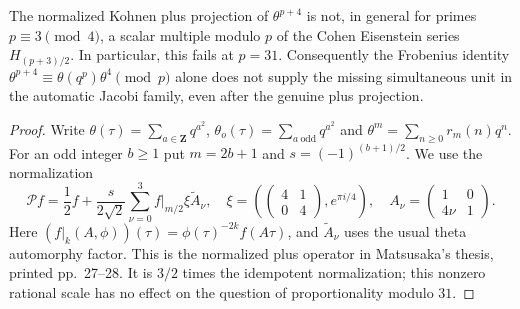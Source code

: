 \begin{proposition}
The normalized Kohnen plus projection of $\theta^{p+4}$ is not,
in general for primes $p\equiv3\pmod4$, a scalar multiple modulo $p$ of the Cohen Eisenstein
series $H_{(p+3)/2}$.  In particular, this fails at $p=31$.
Consequently the Frobenius identity
$\theta^{p+4}\equiv\theta(q^p)\theta^4\pmod p$ alone does
not supply the missing simultaneous unit in the automatic Jacobi
family, even after the genuine plus projection.
\end{proposition}

\begin{proof}
Write $\theta(\tau)=\sum_{a\in\mathbf Z}q^{a^2}$,
$\theta_o(\tau)=\sum_{a\ \mathrm{odd}}q^{a^2}$ and
$\theta^m=\sum_{n\ge0}r_m(n)q^n$.
For an odd integer $b\ge1$ put $m=2b+1$ and
$s=(-1)^{(b+1)/2}$.  We use the normalization
\[
 \mathcal P f=\frac12f+
 \frac{s}{2\sqrt2}\sum_{\nu=0}^3 f|_{m/2}\xi\widetilde A_\nu,
 \quad
 \xi=\left(\begin{pmatrix}4&1\\0&4\end{pmatrix},e^{\pi i/4}\right),
 \quad A_\nu=\begin{pmatrix}1&0\\4\nu&1\end{pmatrix}.
                                                        \tag{KTHT.1}
\]
Here $(f|_k(A,\phi))(\tau)=\phi(\tau)^{-2k}f(A\tau)$,
and $\widetilde A_\nu$ uses the usual theta automorphy factor.
This is the normalized plus operator in Matsusaka's thesis,
printed pp.~27--28.  It is $3/2$ times the idempotent
normalization; this nonzero rational scale has no effect on the
question of proportionality modulo $31$.


\end{proof}
